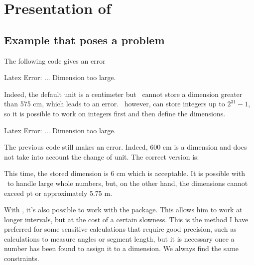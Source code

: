 \section{Presentation of }

\subsection{Example that poses a problem  }

The following code gives an error 

\begin{tkzltxexample}[right margin=7cm]  
\end{tkzltxexample}
 {\color{red} Latex Error: ... Dimension too large.} 

Indeed, the default unit is a centimeter but \TEX\ cannot store a dimension greater than 575 cm, which leads to an error. \TEX\ however, can store integers up to $2^{31}-1$, so it is possible to work on integers first and then define the dimensions.

\begin{tkzltxexample}[right margin=7cm]  
\end{tkzltxexample} 

{\color{red} Latex Error: ... Dimension too large.}
  
The previous code still makes an error. Indeed, 600 cm is a dimension
 and does not take into account the change of unit. The correct version is:
 
\begin{tkzltxexample}[right margin=7cm]  
\end{tkzltxexample} 

This time, the stored dimension is 6 cm which is acceptable. It is possible with \TEX\ to handle large whole numbers, but, on the other hand, the dimensions cannot exceed  pt or approximately 5.75 m.

With \TEX, it's also possible to work with the  package. This allows him to work at longer intervals, but at the cost of a certain slowness. This is the method I have preferred for some sensitive calculations that require good precision, such as calculations to measure angles or segment length, but it is necessary once a number has been found to assign it to a dimension. We always find the same constraints.

